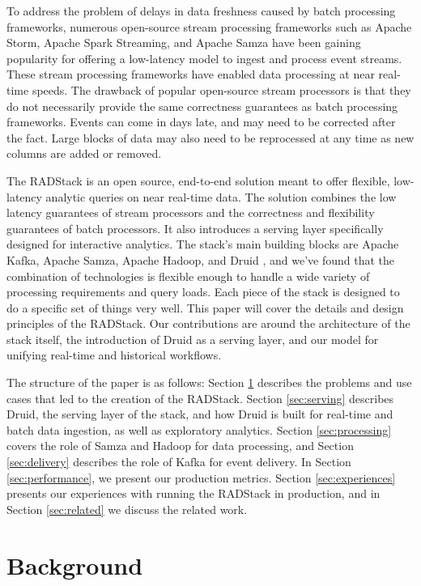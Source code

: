 \documentclass{vldb}
\begin{document}
To address the problem of delays in data freshness caused by batch processing
frameworks, numerous open-source stream processing frameworks such as Apache
Storm\cite{marz2013storm}, Apache Spark Streaming\cite{zaharia2012discretized},
and Apache Samza\cite{2014samza} have been gaining popularity for offering a
low-latency model to ingest and process event streams. These stream processing
frameworks have enabled data processing at near real-time speeds. The drawback
of popular open-source stream processors is that they do not necessarily
provide the same correctness guarantees as batch processing frameworks. Events
can come in days late, and may need to be corrected after the fact. Large
blocks of data may also need to be reprocessed at any time as new columns are
added or removed.

The RADStack is an open source, end-to-end solution meant to offer flexible,
low-latency analytic queries on near real-time data. The solution combines the
low latency guarantees of stream processors and the correctness and flexibility
guarantees of batch processors. It also introduces a serving layer specifically
designed for interactive analytics. The stack’s main building blocks are Apache
Kafka\cite{kreps2011kafka}, Apache Samza, Apache Hadoop, and Druid
\cite{yang2014druid}, and we’ve found that the combination of technologies is
flexible enough to handle a wide variety of processing requirements and query
loads. Each piece of the stack is designed to do a specific set of things very
well. This paper will cover the details and design principles of the RADStack.
Our contributions are around the architecture of the stack itself, the
introduction of Druid as a serving layer, and our model for unifying real-time
and historical workflows.

The structure of the paper is as follows: Section \ref{sec:background}
describes the problems and use cases that led to the creation of the RADStack.
Section \ref{sec:serving} describes Druid, the serving layer of the stack, and
how Druid is built for real-time and batch data ingestion, as well as
exploratory analytics. Section \ref{sec:processing} covers the role of Samza
and Hadoop for data processing, and Section \ref{sec:delivery} describes the
role of Kafka for event delivery. In Section \ref{sec:performance}, we present
our production metrics.  Section \ref{sec:experiences} presents our experiences
with running the RADStack in production, and in Section \ref{sec:related} we
discuss the related work.

\section{Background}
\label{sec:background}
\end{document}
